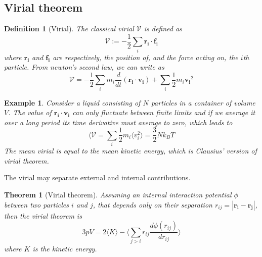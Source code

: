 \documentclass[a4paper]{article}
\newtheorem{eg}{Example}[section]
\theoremstyle{new}
\newtheorem{defi}{Definition}[section]
\newtheorem{thm}{Theorem}[section]
\begin{document}
\subsection{Virial theorem}
\begin{defi}[Virial]
The classical virial $\mathcal{V}$ is defined as
$$\mathcal{V}:=-\frac{1}{2}\sum_i\mathbf{r_i}\cdot\mathbf{f_i}$$
where $\mathbf{r_i}$ and $\mathbf{f_i}$ are respectively, the position of, and the force acting on, the $i$th particle. From newton's second law, we can write as
$$\mathcal{V}=-\frac{1}{2}\sum_im_i\frac{d}{dt}(\mathbf{r_i}\cdot\mathbf{v_i})+\sum_i\frac{1}{2}m_i\mathbf{v_i}^2$$
\end{defi}
\begin{eg}
Consider a liquid consisting of $N$ particles in a container of volume $V$. The value of $\mathbf{r_i}\cdot\mathbf{v_i}$ can only fluctuate between finite limits and if we average it over a long period its time derivative must average to zero, which leads to
$$\langle\mathcal{V}=\sum_i\frac{1}{2}m_i\langle v_i^2\rangle=\frac{3}{2}Nk_BT$$
The mean virial is equal to the mean kinetic energy, which is Clausius' version of virial theorem.
\end{eg}
The virial may separate external and internal contributions. 
\begin{thm}[Virial theorem]
Assuming an internal interaction potential $\phi$ between two particles $i$ and $j$, that depends only on their separation $r_{ij}=|\mathbf{r_i}-\mathbf{r_j}|$, then the virial theorem is
$$3pV=2\langle K\rangle-\bigg\langle\sum_{j>i}r_{ij}\frac{d\phi(r_{ij})}{dr_{ij}}\bigg\rangle$$
where $K$ is the kinetic energy.
\end{thm}
\end{document}
